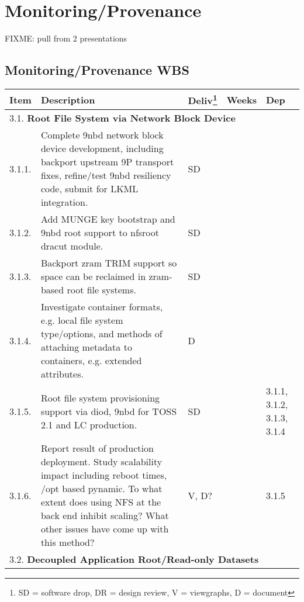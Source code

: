 \section{Monitoring/Provenance}

FIXME: pull from 2 presentations

\newpage
\subsection{Monitoring/Provenance WBS}

\begin{longtable}{|p{1cm}|p{10.2cm}|p{1cm}|p{1cm}|p{1.8cm}|}\hline
  \textbf{Item} & \textbf{Description}
                & \textbf{Deliv}\footnote{SD = software drop,
                        DR = design review, V = viewgraphs, D = document}
                & \textbf{Weeks} & \textbf{Dep} \\
  \hline
  \hline
  \multicolumn{5}{|l|}{3.1. \textbf{Root File System via Network Block Device}} \\
  \hline
  3.1.1.& Complete 9nbd network block device development, including
          backport upstream 9P transport fixes, refine/test 9nbd resiliency
          code, submit for LKML integration.
        & SD
        & 
        & \\
  \hline
  3.1.2.& Add MUNGE key bootstrap and 9nbd root support to nfsroot
	  dracut module.
        & SD
        & 
        & \\
  \hline
  3.1.3.& Backport zram TRIM support so space can be reclaimed in
          zram-based root file systems.
        & SD
        & 
        & \\
  \hline
  3.1.4.& Investigate container formats, e.g. local file system type/options,
          and methods of attaching metadata to containers, e.g. extended
          attributes.
        & D
        & 
        & \\
  \hline
  3.1.5.& Root file system provisioning support via diod, 9nbd for TOSS 2.1
          and LC production.
        & SD
        & 
        & 3.1.1, 3.1.2, 3.1.3, 3.1.4\\
  \hline
  3.1.6.& Report result of production deployment.
	  Study scalability impact including reboot times, /opt based pynamic.
	  To what extent does using NFS at the back end inhibit scaling?
	  What other issues have come up with this method?
        & V, D?
        & 
        & 3.1.5\\
  \hline
  \multicolumn{5}{|l|}{3.2. \textbf{Decoupled Application Root/Read-only Datasets}} \\

\end{longtable}
